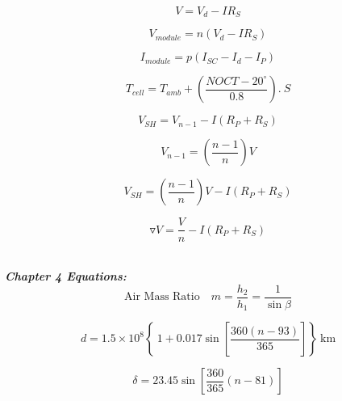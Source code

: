 \documentclass[12pt]{article}
\begin{document}
\begin{equation}
\label{pv11}
V=V_{d}-IR_{S}
\end{equation}

\begin{equation}
\label{mod1}
V_{{module}}=n(V_{d}-IR_{S})
\end{equation}

\begin{equation}
\label{mod2}
I_{{module}}=p(I_{SC}-I_{d}-I_{P})
\end{equation}

\begin{equation}
\label{tefpv}
T_{{cell}}=T_{{amb}}+\left(\frac{NOCT-20^{\circ}}{0.8}\right)
.\ S
\end{equation}

\begin{equation}
\label{shade1}
V_{SH}=V_{n-1}-I(R_{P}+R_{S})
\end{equation}

\begin{equation}
\label{shade2}
V_{n-1}=\left(\frac{n-1}{n}\right)V
\end{equation}

\begin{equation}
\label{shade3}
V_{SH}=\left(\frac{n-1}{n}\right)V-I(R_{P}+R_{S})
\end{equation}

\begin{equation}
\label{shade4}
\triangledown V=\frac{V}{n}-I(R_{P}+R_{S})
\end{equation}

\\


\textbf{\textit{\large{Chapter 4 Equations:}}}\\

\begin{equation}
\label{amr}
\text{Air Mass Ratio}\quad m=\frac{h_{2}}{h_{1}}=\frac{1}{\sin{\beta}}
\end{equation}

\begin{equation}
\label{eo}
d=1.5\times10^{8}\left \{\ 1+0.017 \sin \left[ \frac{360(n-93)}{365} \right] \right\} \ \text{km}
\end{equation}

\begin{equation}
\label{sdec}
\delta =23.45 \sin \left[ \frac{360}{365} (n-81)\right]  
\end{equation}
\end{document}
